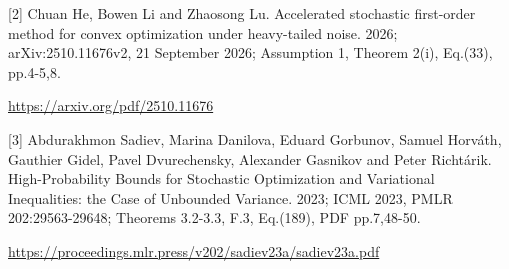 \documentclass[10pt,a4paper]{article}
\begin{document}
[2] Chuan He, Bowen Li and Zhaosong Lu. Accelerated stochastic first-order method for convex optimization under heavy-tailed noise. 2026; arXiv:2510.11676v2, 21 September 2026; Assumption 1, Theorem 2(i), Eq.(33), pp.4-5,8.



\url{https://arxiv.org/pdf/2510.11676}



[3] Abdurakhmon Sadiev, Marina Danilova, Eduard Gorbunov, Samuel Horváth, Gauthier Gidel, Pavel Dvurechensky, Alexander Gasnikov and Peter Richtárik. High-Probability Bounds for Stochastic Optimization and Variational Inequalities: the Case of Unbounded Variance. 2023; ICML 2023, PMLR 202:29563-29648; Theorems 3.2-3.3, F.3, Eq.(189), PDF pp.7,48-50.



\url{https://proceedings.mlr.press/v202/sadiev23a/sadiev23a.pdf}
\end{document}

